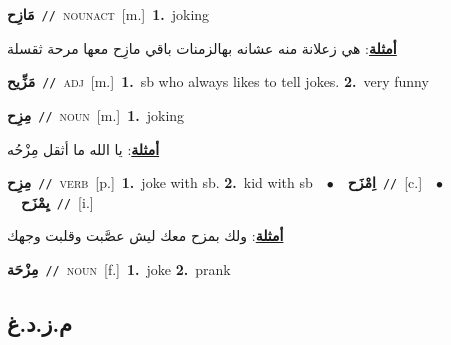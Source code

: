 \documentclass[10pt,a4paper,twoside]{article} %
\begin{document}
\begin{multicols}{2}
{\setlength\topsep{0pt}\textbf{\foreignlanguage{arabic}{مَازِح}}\ {\color{gray}\texttt{//}\color{black}}\ \textsc{noun\textunderscore act}\ [m.]\ \textbf{1.}~joking\  \begin{flushright}\color{gray}\foreignlanguage{arabic}{\textbf{\underline{\foreignlanguage{arabic}{أمثلة}}}: هي زعلانة منه عشانه بهالزمنات باقي مازِح معها مرحة ثقسلة}\end{flushright}\color{black}} \vspace{2mm}

{\setlength\topsep{0pt}\textbf{\foreignlanguage{arabic}{مَزِّيح}}\ {\color{gray}\texttt{//}\color{black}}\ \textsc{adj}\ [m.]\ \textbf{1.}~sb who always likes to tell jokes.  \textbf{2.}~very funny\ } \vspace{2mm}

{\setlength\topsep{0pt}\textbf{\foreignlanguage{arabic}{مِزِح}}\ {\color{gray}\texttt{//}\color{black}}\ \textsc{noun}\ [m.]\ \textbf{1.}~joking\  \begin{flushright}\color{gray}\foreignlanguage{arabic}{\textbf{\underline{\foreignlanguage{arabic}{أمثلة}}}: يا الله ما أثقل مِزْحُه}\end{flushright}\color{black}} \vspace{2mm}

{\setlength\topsep{0pt}\textbf{\foreignlanguage{arabic}{مِزِح}}\ {\color{gray}\texttt{//}\color{black}}\ \textsc{verb}\ [p.]\ \textbf{1.}~joke with sb.  \textbf{2.}~kid with sb\ \ $\bullet$\ \ \setlength\topsep{0pt}\textbf{\foreignlanguage{arabic}{اِمْزَح}}\ {\color{gray}\texttt{//}\color{black}}\ [c.]\ \ $\bullet$\ \ \setlength\topsep{0pt}\textbf{\foreignlanguage{arabic}{يِمْزَح}}\ {\color{gray}\texttt{//}\color{black}}\ [i.]\  \begin{flushright}\color{gray}\foreignlanguage{arabic}{\textbf{\underline{\foreignlanguage{arabic}{أمثلة}}}: ولك بمزح معك ليش عصَّبت وقلبت وجهك}\end{flushright}\color{black}} \vspace{2mm}

{\setlength\topsep{0pt}\textbf{\foreignlanguage{arabic}{مِزْحَة}}\ {\color{gray}\texttt{//}\color{black}}\ \textsc{noun}\ [f.]\ \textbf{1.}~joke  \textbf{2.}~prank\ } \vspace{2mm}

\vspace{-3mm}
\subsection*{\color{blue}\foreignlanguage{arabic}{م.ز.د.غ}\color{blue}{}} 


\end{multicols}
\end{document}
